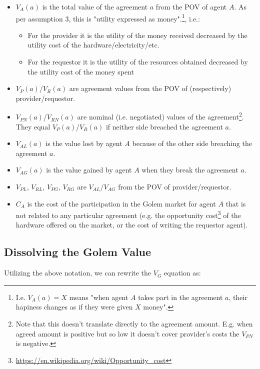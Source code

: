 \documentclass{article}
\begin{document}
\begin{itemize}
\item $V_A(a)$ is the total value of the agreement $a$ from the POV of agent $A$. As per assumption 3, this is "utility expressed as money".\footnote{
I.e. $V_A(a) = X$ means "when agent $A$ takes part in the agreement $a$, their hapiness changes as if they were given $X$ money".}, i.e.:
    \begin{itemize}
        \item For the provider it is the utility of the money received decreased by the utility cost of the hardware/electricity/etc.
        \item For the requestor it is the utility of the resources obtained decreased by the utility cost of the money spent
    \end{itemize}
\item $V_P(a)$/$V_R(a)$ are agreement values from the POV of (respectively) provider/requestor.
\item $V_{PN}(a)$/$V_{RN}(a)$ are nominal (i.e. negotiated) values of the agreement\footnote{
   Note that this doesn't translate directly to the agreement amount. E.g. when agreed amount is positive but so low it doesn't cover provider's costs the $V_{PN}$ is negative.
}. They equal $V_P(a)$/$V_R(a)$ if neither side breached the agreement $a$.
\item $V_{AL}(a)$ is the value lost by agent $A$ because of the other side breaching the agreement $a$.
\item $V_{AG}(a)$ is the value gained by agent $A$ when they break the agreement $a$.
\item $V_{PL}$, $V_{RL}$, $V_{PG}$, $V_{RG}$ are $V_{AL}$/$V_{AG}$ from the POV of provider/requestor.
\item $C_A$ is the cost of the participation in the Golem market for agent $A$ that is not related to any particular agreement 
(e.g. the opportunity cost\footnote{\href{https://en.wikipedia.org/wiki/Opportunity\_cost}{https://en.wikipedia.org/wiki/Opportunity\_cost}} of the hardware offered on the market, 
or the cost of writing the requestor agent).
\end{itemize}

\subsection{Dissolving the Golem Value}

Utilizing the above notation, we can rewrite the $V_G$ equation as:
\end{document}
